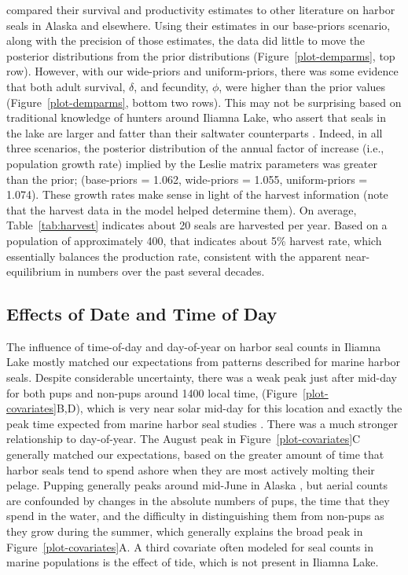 \documentclass[]{risa}\usepackage[]{graphicx}\usepackage[]{color}
\begin{document}
 compared their survival and productivity estimates to other literature on harbor seals in Alaska and elsewhere.  Using their estimates in our base-priors scenario, along with the precision of those estimates, the data did little to move the posterior distributions from the prior distributions (Figure~\ref{plot-demparms}, top row).  However, with our wide-priors and uniform-priors, there was some evidence that both adult survival, $\delta$, and fecundity, $\phi$, were higher than the prior values (Figure~\ref{plot-demparms}, bottom two rows).  This may not be surprising based on traditional knowledge of hunters around Iliamna Lake, who assert that seals in the lake are larger and fatter than their saltwater counterparts \citep{Burn:Van:With:Hole:Asko:inte:2016}. Indeed, in all three scenarios, the posterior distribution of the annual factor of increase (i.e., population growth rate) implied by the Leslie matrix parameters was greater than the prior; (base-priors = 1.062, wide-priors = 1.055, uniform-priors = 1.074).  These growth rates make sense in light of the harvest information (note that the harvest data in the model helped determine them).  On average, Table~\ref{tab:harvest} indicates about 20 seals are harvested per year.  Based on a population of approximately 400, that indicates about 5\% harvest rate, which essentially balances the production rate, consistent with the apparent near-equilibrium in numbers over the past several decades.

\subsection{Effects of Date and Time of Day}

The influence of time-of-day and day-of-year on harbor seal counts in Iliamna Lake mostly matched our expectations from patterns described for marine harbor seals. Despite considerable uncertainty, there was a weak peak just after mid-day for both pups and non-pups around 1400 local time, (Figure~\ref{plot-covariates}B,D), which is very near solar mid-day for this location and exactly the peak time expected from marine harbor seal studies \citep[e.g.,][]{Simp:With:Cesa:Bove:stab:2003}. There was a much stronger relationship to day-of-year. The August peak in Figure~\ref{plot-covariates}C generally matched our expectations, based on the greater amount of time that harbor seals tend to spend ashore when they are most actively molting their pelage.  Pupping generally peaks around mid-June in Alaska \citep{Math:Pend:decl:2006}, but aerial counts are confounded by changes in the absolute numbers of pups, the time that they spend in the water, and the difficulty in distinguishing them from non-pups as they grow during the summer, which generally explains the broad peak in Figure~\ref{plot-covariates}A. A third covariate often modeled for seal counts in marine populations is the effect of tide, which is not present in Iliamna Lake.
\end{document}
